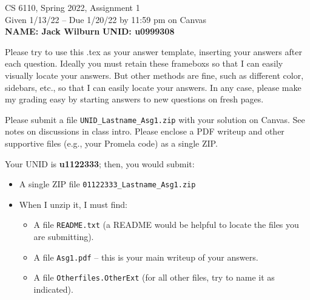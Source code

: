 \documentclass[11pt]{article}
\begin{document}



\begin{center}
\begin{large}
  CS 6110, Spring 2022, Assignment 1  \\
  Given 1/13/22 -- Due 1/20/22 by 11:59 pm on Canvas
  \ \\
      {  {\Large\bf NAME: Jack Wilburn} \hfill {\Large\bf UNID: u0999308}\hspace{4cm} }
\end{large}
\end{center}
\begin{large}
          Please try to
          use this .tex as your answer template,
          inserting your answers
          after each question.
          Ideally
          you must retain
          these frameboxs so that I can easily visually
          locate your answers.
          But other methods are fine, such
          as different
          color, sidebars, etc., so that I can
          easily locate your answers.
          In any case, please
          make my grading easy by 
          starting answers to new questions
          on fresh pages.
\end{large}

\date{}


 Please submit a file
\verb|UNID_Lastname_Asg1.zip| with your solution on Canvas.
%
See notes on discussions in class intro.
%
Please enclose a PDF writeup and other supportive files (e.g.,
your Promela code) as a single ZIP.

 Your UNID is {\bf u1122333}; then, you
would submit:
%
\begin{itemize}
\item A single ZIP file \verb|01122333_Lastname_Asg1.zip|
\item When I unzip it, I must find:
  \begin{itemize}
  \item A file \verb|README.txt| (a README would be helpful
    to locate the files you are submitting).
  \item A file \verb|Asg1.pdf| -- this is your main writeup
    of your answers.
  \item A file \verb|Otherfiles.OtherExt| (for all other files,
    try to name it as indicated).
  \end{itemize}
\end{itemize}
\end{document}
